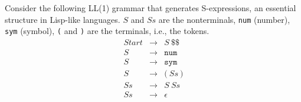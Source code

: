 \documentclass[11pt]{amsart}
\begin{document}
\vspace{0.15in}
\newpage

 Consider the following LL(1) grammar that generates S-expressions, an essential structure in Lisp-like languages. $S$ and $\mathit{Ss}$ are the nonterminals, \texttt{num} (number), \texttt{sym} (symbol), \texttt{(} and \texttt{)} are the terminals, i.e., the tokens.  
\[
\begin{array}{lll}
\mathit{Start} & \rightarrow & S\ \texttt{\$\$}\\
S & \rightarrow & \texttt{num} \\
S & \rightarrow & \texttt{sym} \\
S & \rightarrow & \texttt{(} \ Ss \ \texttt{)} \\
Ss & \rightarrow & S \  Ss \\
Ss & \rightarrow & \epsilon 
\end{array}
\]
\end{document}

